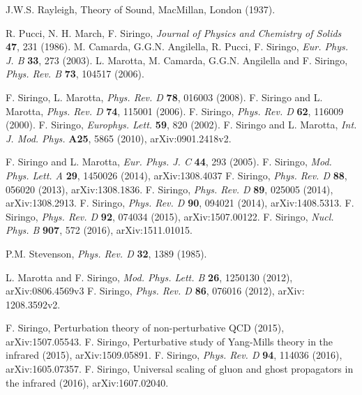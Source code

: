 \documentclass[aps,preprint]{revtex4}
\begin{document}
%


\begin{thebibliography}{10}



 J.W.S. Rayleigh, Theory of Sound, MacMillan, London (1937).

 R. Pucci, N. H. March, F. Siringo, {\em Journal of Physics and Chemistry of Solids} {\bf 47}, 231 (1986).
 M. Camarda, G.G.N. Angilella, R. Pucci, F. Siringo, 
{\em Eur. Phys. J. B} {\bf 33}, 273 (2003).
 L. Marotta, M. Camarda, G.G.N. Angilella and F. Siringo, 
{\em Phys. Rev. B} {\bf 73}, 104517 (2006). 

 F. Siringo, L. Marotta, {\em Phys. Rev. D} {\bf 78}, 016003 (2008).
 F. Siringo and L. Marotta, {\em Phys. Rev. D} {\bf 74}, 115001 (2006).
 F. Siringo,  {\em Phys. Rev. D} {\bf 62}, 116009 (2000).
 F. Siringo, {\em Europhys. Lett.} {\bf 59}, 820 (2002).
 F. Siringo and L. Marotta, {\em Int. J. Mod. Phys.} {\bf A25}, 5865 (2010), arXiv:0901.2418v2.

 F. Siringo and L. Marotta, {\em Eur. Phys. J. C} {\bf  44}, 293 (2005).
 F. Siringo, {\em Mod. Phys. Lett. A} {\bf 29}, 1450026 (2014), arXiv:1308.4037 
  F. Siringo, {\em Phys. Rev. D} {\bf 88}, 056020 (2013), arXiv:1308.1836.
 F. Siringo, {\em Phys. Rev. D} {\bf 89},  025005 (2014), arXiv:1308.2913.
 F. Siringo, {\em Phys. Rev. D} {\bf  90}, 094021 (2014), arXiv:1408.5313.
 F. Siringo, {\em Phys. Rev. D} {\bf 92}, 074034 (2015), arXiv:1507.00122.
 F. Siringo, {\em Nucl. Phys. B} {\bf 907}, 572 (2016), arXiv:1511.01015.

 P.M. Stevenson, {\em Phys. Rev. D} {\bf 32}, 1389 (1985).

 L. Marotta and F. Siringo, {\em Mod. Phys. Lett. B} {\bf 26}, 1250130 (2012), arXiv:0806.4569v3
 F. Siringo, {\em Phys. Rev. D} {\bf 86}, 076016 (2012), arXiv: 1208.3592v2.
 
 F. Siringo, Perturbation theory of non-perturbative QCD (2015), arXiv:1507.05543.
  F. Siringo, Perturbative study of Yang-Mills theory in the infrared (2015), arXiv:1509.05891.
 F. Siringo, {\em Phys. Rev. D} {\bf 94}, 114036 (2016),  arXiv:1605.07357.
 F. Siringo, Universal scaling of gluon and ghost propagators in the infrared (2016), arXiv:1607.02040.


\end{thebibliography}
\end{document}
